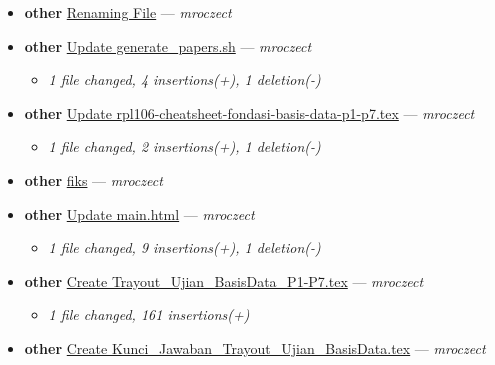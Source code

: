 \begin{itemize}[leftmargin=1.5em]
  \item \textbf{other} \href{https://github.com/mroczect/mroczect.github.io/commit/c1704cff3da3645825e350826526219eeef3f930}{Renaming File} --- \textit{mroczect}
  \item \textbf{other} \href{https://github.com/mroczect/mroczect.github.io/commit/fb4989ae2a28de2b033aa027c2cf02bf8e99d204}{Update generate\_papers.sh} --- \textit{mroczect}
  \begin{itemize}[leftmargin=1.5em]
    \item \small\textit{1 file changed, 4 insertions(+), 1 deletion(-)}
  \end{itemize}
  \item \textbf{other} \href{https://github.com/mroczect/mroczect.github.io/commit/c2242f67177afb61067115e7823c8f181cec27d9}{Update rpl106-cheatsheet-fondasi-basis-data-p1-p7.tex} --- \textit{mroczect}
  \begin{itemize}[leftmargin=1.5em]
    \item \small\textit{1 file changed, 2 insertions(+), 1 deletion(-)}
  \end{itemize}
  \item \textbf{other} \href{https://github.com/mroczect/mroczect.github.io/commit/f7e0111680d1453f5413b845f3ef6aefde54d218}{fiks} --- \textit{mroczect}
  \item \textbf{other} \href{https://github.com/mroczect/mroczect.github.io/commit/dcfcf83300d3ba73f32fa2647c629a37049bf78b}{Update main.html} --- \textit{mroczect}
  \begin{itemize}[leftmargin=1.5em]
    \item \small\textit{1 file changed, 9 insertions(+), 1 deletion(-)}
  \end{itemize}
  \item \textbf{other} \href{https://github.com/mroczect/mroczect.github.io/commit/035c602e5d320825ab97dd7a216aeba35bb3613f}{Create Trayout\_Ujian\_BasisData\_P1-P7.tex} --- \textit{mroczect}
  \begin{itemize}[leftmargin=1.5em]
    \item \small\textit{1 file changed, 161 insertions(+)}
  \end{itemize}
  \item \textbf{other} \href{https://github.com/mroczect/mroczect.github.io/commit/a5f72d88cacd1008b778d102f1446395833b26db}{Create Kunci\_Jawaban\_Trayout\_Ujian\_BasisData.tex} --- \textit{mroczect}
  \begin{itemize}[leftmargin=1.5em]

\end{itemize}
\end{itemize}

